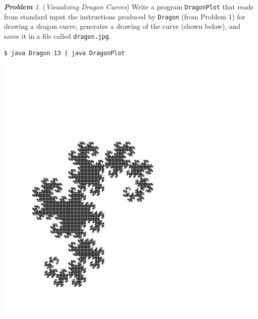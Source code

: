 \documentclass[a4paper, 12pt]{article}
\newcommand{\tit}{\textit}
\theoremstyle{remark}
\newtheorem{problem}{\normalfont \bfseries Problem}
\begin{document}
\begin{problem}
(\tit{Visualizing Dragon Curves}) Write a program \lstinline$DragonPlot$ that reads from standard input the instructions produced by \lstinline$Dragon$ (from Problem 1) for drawing a dragon curve, generates a drawing of the curve (shown below), and saves it in a file called \lstinline$dragon.jpg$. 

\begin{lstlisting}[language=bash]
$ java Dragon 13 | java DragonPlot
\end{lstlisting}

\begin{center}
\includegraphics[scale=0.35]{dragon_reference.jpg}
\end{center}
\end{problem}
\end{document}
